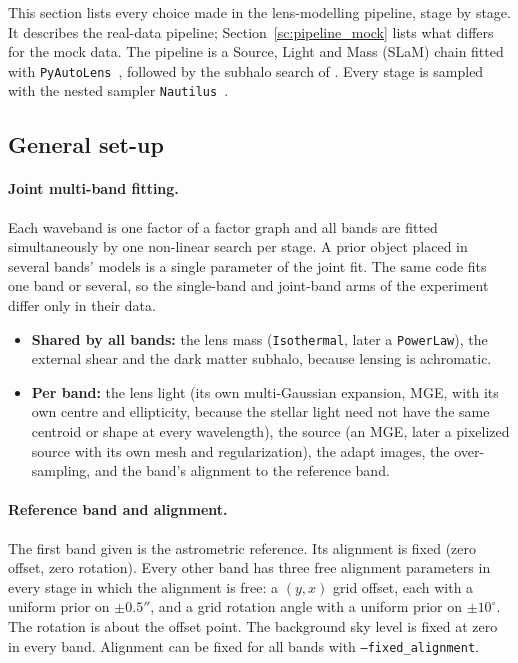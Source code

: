 
This section lists every choice made in the lens-modelling pipeline, stage by stage. It describes the
real-data pipeline; Section~\ref{sc:pipeline_mock} lists what differs for the mock data. The pipeline
is a Source, Light and Mass (SLaM) chain fitted with \texttt{PyAutoLens}~\citep{Nightingale2021},
followed by the subhalo search of \citet{Nightingale2024}. Every stage is sampled with the nested
sampler \texttt{Nautilus}~\citep{nautilus}.

\subsection{\label{sc:pipeline_general}General set-up}

\paragraph{Joint multi-band fitting.} Each waveband is one factor of a factor graph and all bands are
fitted simultaneously by one non-linear search per stage. A prior object placed in several bands'
models is a single parameter of the joint fit. The same code fits one band or several, so the
single-band and joint-band arms of the experiment differ only in their data.
\begin{itemize}
    \item \textbf{Shared by all bands:} the lens mass (\texttt{Isothermal}, later a
    \texttt{PowerLaw}), the external shear and the dark matter subhalo, because lensing is achromatic.
    \item \textbf{Per band:} the lens light (its own multi-Gaussian expansion, MGE, with its own
    centre and ellipticity, because the stellar light need not have the same centroid or shape at
    every wavelength), the source (an MGE, later a pixelized source with its own mesh and
    regularization), the adapt images, the over-sampling, and the band's alignment to the
    reference band.
\end{itemize}

\paragraph{Reference band and alignment.} The first band given is the astrometric reference. Its
alignment is fixed (zero offset, zero rotation). Every other band has three free alignment
parameters in every stage in which the alignment is free: a $(y, x)$ grid offset, each with a uniform
prior on $\pm 0.5''$, and a grid rotation angle with a uniform prior on $\pm 10^\circ$. The rotation
is about the offset point. The background sky level is fixed at zero in every band. Alignment can be
fixed for all bands with \texttt{--fixed\_alignment}.

